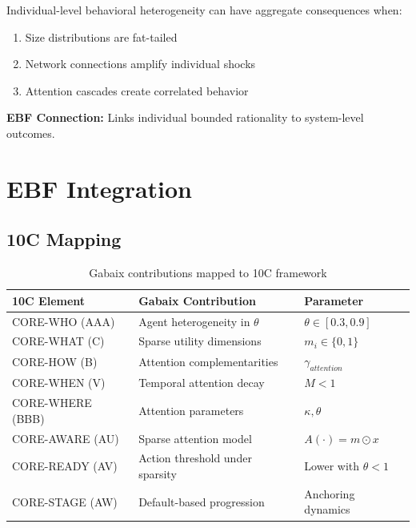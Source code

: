 \begin{axiom}
\label{ax:xg6}
Individual-level behavioral heterogeneity can have aggregate consequences when:
\begin{enumerate}
    \item Size distributions are fat-tailed
    \item Network connections amplify individual shocks
    \item Attention cascades create correlated behavior
\end{enumerate}
\textbf{EBF Connection:} Links individual bounded rationality to system-level outcomes.
\end{axiom}

\section{EBF Integration}

\subsection{10C Mapping}

\begin{table}[h]
\centering
\begin{tabular}{lll}
\textbf{10C Element} & \textbf{Gabaix Contribution} & \textbf{Parameter} \\
\hline
CORE-WHO (AAA) & Agent heterogeneity in $\theta$ & $\theta \in [0.3, 0.9]$ \\
CORE-WHAT (C) & Sparse utility dimensions & $m_i \in \{0, 1\}$ \\
CORE-HOW (B) & Attention complementarities & $\gamma_{attention}$ \\
CORE-WHEN (V) & Temporal attention decay & $M < 1$ \\
CORE-WHERE (BBB) & Attention parameters & $\kappa, \theta$ \\
CORE-AWARE (AU) & Sparse attention model & $A(\cdot) = m \odot x$ \\
CORE-READY (AV) & Action threshold under sparsity & Lower with $\theta < 1$ \\
CORE-STAGE (AW) & Default-based progression & Anchoring dynamics \\
\end{tabular}
\caption{Gabaix contributions mapped to 10C framework}
\end{table}


